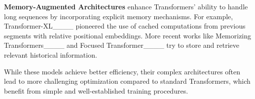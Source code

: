 \textbf{Memory-Augmented Architectures} enhance Transformers' ability to handle long sequences by incorporating explicit memory mechanisms. For example, Transformer-XL____ pioneered the use of cached computations from previous segments with relative positional embeddings. More recent works like Memorizing Transformers____ and Focused Transformer____ try to store and retrieve relevant historical information.

While these models achieve better efficiency, their complex architectures often lead to more challenging optimization compared to standard Transformers, which benefit from simple and well-established training procedures.





